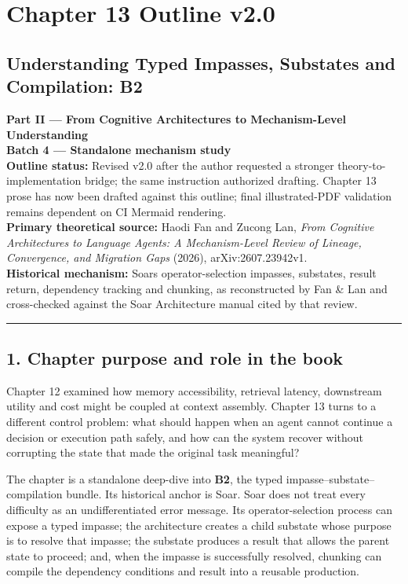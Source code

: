 \section{Chapter 13 Outline v2.0}\label{chapter-13-outline-v20}

\subsection{Understanding Typed Impasses, Substates and Compilation: B2}\label{understanding-typed-impasses-substates-and-compilation-b2}

\textbf{Part II --- From Cognitive Architectures to Mechanism-Level Understanding}\\
\textbf{Batch 4 --- Standalone mechanism study}\\
\textbf{Outline status:} Revised v2.0 after the author requested a stronger theory-to-implementation bridge; the same instruction authorized drafting. Chapter 13 prose has now been drafted against this outline; final illustrated-PDF validation remains dependent on CI Mermaid rendering.\\
\textbf{Primary theoretical source:} Haodi Fan and Zucong Lan, \emph{From Cognitive Architectures to Language Agents: A Mechanism-Level Review of Lineage, Convergence, and Migration Gaps} (2026), arXiv:2607.23942v1.\\
\textbf{Historical mechanism:} Soar\textquotesingle s operator-selection impasses, substates, result return, dependency tracking and chunking, as reconstructed by Fan \& Lan and cross-checked against the Soar Architecture manual cited by that review.

\begin{center}\rule{0.5\linewidth}{0.5pt}\end{center}

\subsection{1. Chapter purpose and role in the book}\label{1-chapter-purpose-and-role-in-the-book}

Chapter 12 examined how memory accessibility, retrieval latency, downstream utility and cost might be coupled at context assembly. Chapter 13 turns to a different control problem: what should happen when an agent cannot continue a decision or execution path safely, and how can the system recover without corrupting the state that made the original task meaningful?

The chapter is a standalone deep-dive into \textbf{B2}, the typed impasse--substate--compilation bundle. Its historical anchor is Soar. Soar does not treat every difficulty as an undifferentiated error message. Its operator-selection process can expose a typed impasse; the architecture creates a child substate whose purpose is to resolve that impasse; the substate produces a result that allows the parent state to proceed; and, when the impasse is successfully resolved, chunking can compile the dependency conditions and result into a reusable production.

